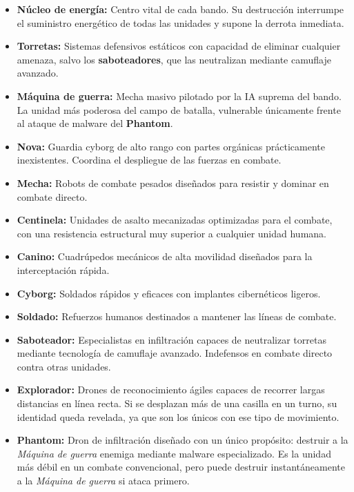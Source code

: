 \begin{itemize}
	\item \textbf{Núcleo de energía:} Centro vital de cada bando. Su destrucción interrumpe el suministro energético de todas las unidades y supone la derrota inmediata.
	
	\item \textbf{Torretas:} Sistemas defensivos estáticos con capacidad de eliminar cualquier amenaza, salvo los \textbf{saboteadores}, que las neutralizan mediante camuflaje avanzado.
	
	\item \textbf{Máquina de guerra:} Mecha masivo pilotado por la IA suprema del bando. La unidad más poderosa del campo de batalla, vulnerable únicamente frente al ataque de malware del 
	\textbf{Phantom}.
	
	\item \textbf{Nova:} Guardia cyborg de alto rango con partes orgánicas prácticamente inexistentes. Coordina el despliegue de las fuerzas en combate.
	
	\item \textbf{Mecha:} Robots de combate pesados diseñados para resistir y dominar en combate directo.
	
	\item \textbf{Centinela:} Unidades de asalto mecanizadas optimizadas para el combate, con una resistencia estructural muy superior a cualquier unidad humana.
	
	\item \textbf{Canino:} Cuadrúpedos mecánicos de alta movilidad diseñados para la interceptación rápida.
	
	\item \textbf{Cyborg:} Soldados rápidos y eficaces con implantes cibernéticos ligeros.
	
	\item \textbf{Soldado:} Refuerzos humanos destinados a mantener las líneas de combate.
	
	\item \textbf{Saboteador:} Especialistas en infiltración capaces de neutralizar torretas mediante tecnología de camuflaje avanzado. Indefensos en combate directo contra otras unidades.
	
	\item \textbf{Explorador:} Drones de reconocimiento ágiles capaces de recorrer largas distancias en línea recta. Si se desplazan más de una casilla en un turno, su identidad queda revelada, ya que son los únicos con ese tipo de movimiento.
	
	\item \textbf{Phantom:} Dron de infiltración diseñado con un único propósito: destruir a la \textit{Máquina de guerra} enemiga mediante malware especializado. Es la unidad más débil en un combate convencional, pero puede destruir instantáneamente a la \textit{Máquina de guerra} si ataca primero.
\end{itemize}

